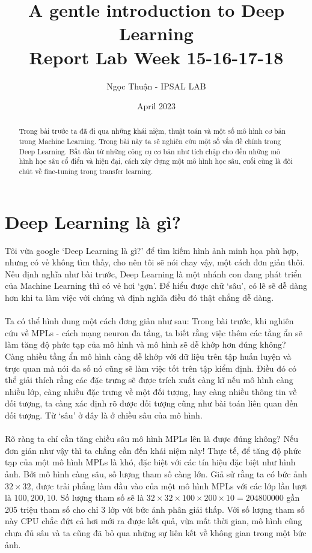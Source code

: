 \documentclass{article}
\title{A gentle introduction to Deep Learning \\ \Large Report Lab Week 15-16-17-18}
\author{Ngọc Thuận - IPSAL LAB}
\date{April 2023}
\begin{document}
\maketitle
\begin{abstract}
Trong bài trước ta đã đi qua những khái niệm, thuật toán và một số mô hình cơ bản trong Machine Learning. Trong bài này ta sẽ nghiên cứu một số vấn đề chính trong Deep Learning. Bắt đầu từ những công cụ cơ bản như tích chập cho đến những mô hình học sâu cổ điển và hiện đại, cách xây dựng một mô hình học sâu, cuối cùng là đôi chút về fine-tuning trong transfer learning.    
\end{abstract}
\tableofcontents
\newpage
\section{Deep Learning là gì?}
Tôi vừa google `Deep Learning là gì?' để tìm kiếm hình ảnh minh họa phù hợp, nhưng có vẻ không tìm thấy, cho nên tôi sẽ nói chay vậy, một cách đơn giản thôi. Nếu định nghĩa như bài trước, Deep Learning là một nhánh con đang phát triển của Machine Learning thì có vẻ hơi `gợn'. Để hiểu được chữ `sâu', có lẽ sẽ dễ dàng hơn khi ta làm việc với chúng và định nghĩa điều đó thật chẳng dễ dàng.\\\\
Ta có thể hình dung một cách đơng giản như sau: Trong bài trước, khi nghiên cứu về MPLs - cách mạng neuron đa tầng, ta biết rằng việc thêm các tầng ẩn sẽ làm tăng độ phức tạp của mô hình và mô hình sẽ dễ khớp hơn đúng không? Càng nhiều tầng ẩn mô hình càng dễ khớp với dữ liệu trên tập huấn luyện và trực quan mà nói đa số nó cũng sẽ làm việc tốt trên tập kiểm định. Điều đó có thể giải thích rằng các đặc trưng sẽ được trích xuất càng kĩ nếu mô hình càng nhiều lớp, càng nhiều đặc trưng về một đối tượng, hay càng nhiều thông tin về đối tượng, ta càng xác định rõ được đối tượng cũng như bài toán liên quan đến đối tượng. Từ `sâu' ở đây là ở chiều sâu của mô hình.\\\\
Rõ ràng ta chỉ cần tăng chiều sâu mô hình MPLs lên là được đúng không? Nếu đơn giản như vậy thì ta chẳng cần đến khái niệm này! Thực tế, để tăng độ phức tạp của một mô hình MPLs là khó, đặc biệt với các tín hiệu đặc biệt như hình ảnh. Bởi mô hình càng sâu, số lượng tham số càng lớn. Giả sử rằng ta có bức ảnh $32 \times 32$, được trải phẳng làm đầu vào của một mô hình MPLs với các lớp lần lượt là $100, 200, 10$. Số lượng tham số sẽ là $32\times 32 \times100\times200\times10 = 204800000
$ gần 205 triệu tham số cho chỉ 3 lớp với bức ảnh phân giải thấp. Với số lượng tham số này CPU chắc đứt cả hơi mới ra được kết quả, vừa mất thời gian, mô hình cũng chưa đủ sâu và ta cũng đã bỏ qua những sự liên kết về không gian trong một bức ảnh.\\\\
\end{document}
